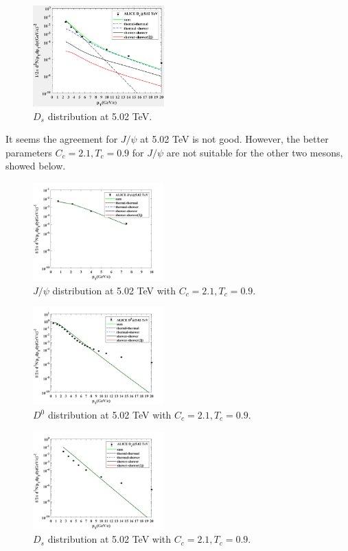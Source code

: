 \documentclass[twocolumn,aps,superscriptaddress,nofootinbib,floatfix]{revtex4}
\begin{document}
\begin{figure}[H]
	\includegraphics[width=0.45\textwidth]{v16_Ds_502.png}
	\caption{$D_s$ distribution at 5.02 TeV. }
	\label{fig86}
\end{figure}
It seems the agreement for $J/\psi$ at 5.02 TeV is not good. However, the better parameters $C_c=2.1, T_c=0.9$ for $J/\psi$ are not suitable for the other two mesons, showed below.
 \begin{figure}[H]
	\includegraphics[width=0.45\textwidth]{v16_Jpsi_502_try.png}
	\caption{$J/\psi$ distribution at 5.02 TeV with $C_c=2.1, T_c=0.9$. }
	\label{fig87}
\end{figure}
\begin{figure}[H]
	\includegraphics[width=0.45\textwidth]{v16_D0_502_try.png}
	\caption{$D^0$ distribution at 5.02 TeV with $C_c=2.1, T_c=0.9$. }
	\label{fig88}
\end{figure}

\begin{figure}[H]
	\includegraphics[width=0.45\textwidth]{v16_Ds_502_try.png}
	\caption{$D_s$ distribution at 5.02 TeV with $C_c=2.1, T_c=0.9$. }
	\label{fig89}
\end{figure}
\end{document}
